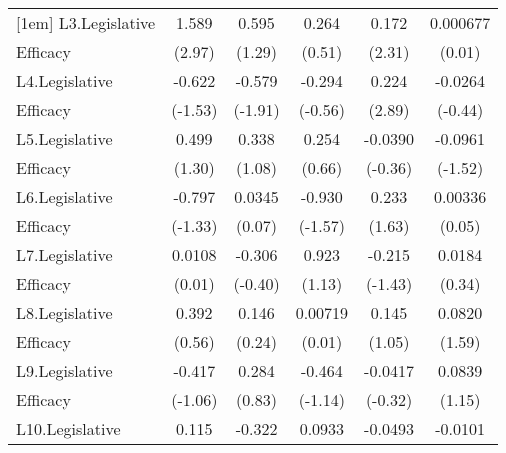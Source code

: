 {\begin{tabular}{l*{5}{c}}
[1em]
L3.Legislative      &       1.589\sym{**} &       0.595         &       0.264         &       0.172\sym{*}  &    0.000677         \\
Efficacy            &      (2.97)         &      (1.29)         &      (0.51)         &      (2.31)         &      (0.01)         \\
[1em]
L4.Legislative      &      -0.622         &      -0.579         &      -0.294         &       0.224\sym{**} &     -0.0264         \\
Efficacy            &     (-1.53)         &     (-1.91)         &     (-0.56)         &      (2.89)         &     (-0.44)         \\
[1em]
L5.Legislative      &       0.499         &       0.338         &       0.254         &     -0.0390         &     -0.0961         \\
Efficacy            &      (1.30)         &      (1.08)         &      (0.66)         &     (-0.36)         &     (-1.52)         \\
[1em]
L6.Legislative      &      -0.797         &      0.0345         &      -0.930         &       0.233         &     0.00336         \\
Efficacy            &     (-1.33)         &      (0.07)         &     (-1.57)         &      (1.63)         &      (0.05)         \\
[1em]
L7.Legislative      &      0.0108         &      -0.306         &       0.923         &      -0.215         &      0.0184         \\
Efficacy            &      (0.01)         &     (-0.40)         &      (1.13)         &     (-1.43)         &      (0.34)         \\
[1em]
L8.Legislative      &       0.392         &       0.146         &     0.00719         &       0.145         &      0.0820         \\
Efficacy            &      (0.56)         &      (0.24)         &      (0.01)         &      (1.05)         &      (1.59)         \\
[1em]
L9.Legislative      &      -0.417         &       0.284         &      -0.464         &     -0.0417         &      0.0839         \\
Efficacy            &     (-1.06)         &      (0.83)         &     (-1.14)         &     (-0.32)         &      (1.15)         \\
[1em]
L10.Legislative     &       0.115         &      -0.322         &      0.0933         &     -0.0493         &     -0.0101         \\

\end{tabular}}
